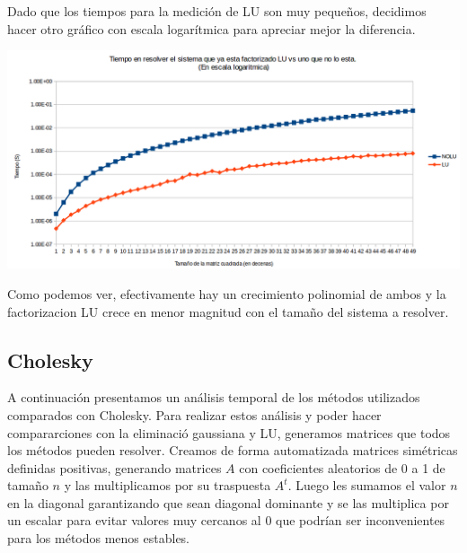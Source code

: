 Dado que los tiempos para la medición de LU son muy pequeños, decidimos hacer otro gráfico con escala logarítmica para apreciar mejor la diferencia.


{\centering
    \includegraphics[scale=0.6]{informe/imagenes/LUVSNOLUDIMLOG.PNG} \\
}

Como podemos ver, efectivamente hay un crecimiento polinomial de ambos y la factorizacion LU crece en menor magnitud con el tamaño del sistema a resolver.

\subsection{Cholesky}

A continuación presentamos un análisis temporal de los métodos utilizados comparados con Cholesky. Para realizar estos análisis y poder hacer compararciones con la eliminació gaussiana y LU, generamos matrices que todos los métodos pueden resolver. Creamos de forma automatizada matrices simétricas definidas positivas, generando matrices $A$ con coeficientes aleatorios de 0 a 1 de tamaño $n$ y las multiplicamos por su traspuesta $A^{t}$. Luego les sumamos el valor $n$ en la diagonal garantizando que sean diagonal dominante y se las multiplica por un escalar para evitar valores muy cercanos al 0 que podrían ser inconvenientes para los métodos menos estables. \\


